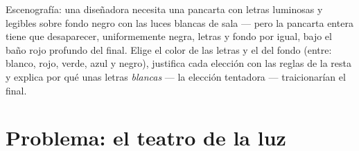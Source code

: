 \begin{exercise}[$\star\star\star$]\label{exo:g8:colors-spectra:12}
Escenografía: una diseñadora necesita una pancarta con letras
luminosas y legibles sobre fondo negro con las luces blancas de sala
--- pero la pancarta entera tiene que desaparecer, uniformemente negra,
letras y fondo por igual, bajo el baño rojo profundo del final. Elige
el color de las letras y el del fondo (entre: blanco, rojo, verde, azul
y negro), justifica cada elección con las reglas de la resta y explica
por qué unas letras \emph{blancas} --- la elección tentadora ---
traicionarían el final.
\end{exercise}

\section{Problema: el teatro de la luz}

